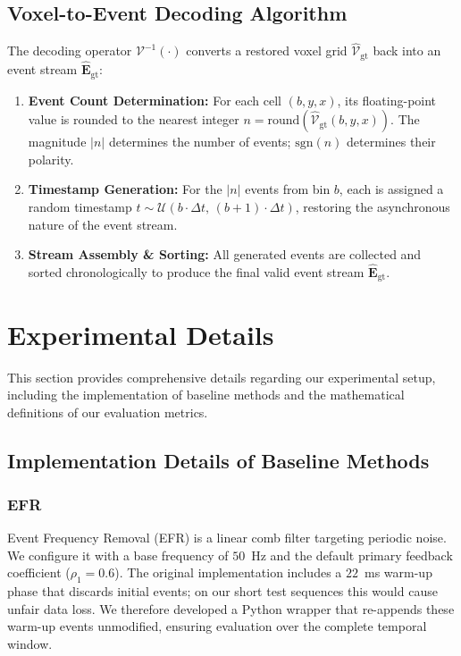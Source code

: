 \subsection{Voxel-to-Event Decoding Algorithm}
The decoding operator $\mathcal{V}^{-1}(\cdot)$ converts a restored voxel grid $\hat{\mathcal{V}}_{\mathrm{gt}}$ back into an event stream $\hat{\mathbf{E}}_{\mathrm{gt}}$:
\begin{enumerate}
    \item \textbf{Event Count Determination:} For each cell $(b, y, x)$, its floating-point value is rounded to the nearest integer $n = \mathrm{round}(\hat{\mathcal{V}}_{\mathrm{gt}}(b, y, x))$. The magnitude $|n|$ determines the number of events; $\mathrm{sgn}(n)$ determines their polarity.
    \item \textbf{Timestamp Generation:} For the $|n|$ events from bin $b$, each is assigned a random timestamp $t \sim \mathcal{U}(b \cdot \Delta t,\, (b{+}1) \cdot \Delta t)$, restoring the asynchronous nature of the event stream.
    \item \textbf{Stream Assembly \& Sorting:} All generated events are collected and sorted chronologically to produce the final valid event stream $\hat{\mathbf{E}}_{\mathrm{gt}}$.
\end{enumerate}



\section{Experimental Details}
\label{app:experimental_details}

This section provides comprehensive details regarding our experimental setup, including the implementation of baseline methods and the mathematical definitions of our evaluation metrics.

\subsection{Implementation Details of Baseline Methods}
\label{app:baselines_details}

    \subsubsection{EFR~\cite{wang2022linear}}
    Event Frequency Removal (EFR) is a linear comb filter targeting periodic noise. We configure it with a base frequency of $50$~Hz and the default primary feedback coefficient ($\rho_1 = 0.6$). The original implementation includes a $22$~ms warm-up phase that discards initial events; on our short test sequences this would cause unfair data loss. We therefore developed a Python wrapper that re-appends these warm-up events unmodified, ensuring evaluation over the complete temporal window.

